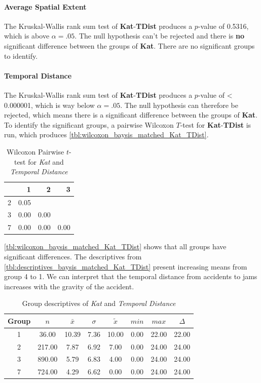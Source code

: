 \paragraph{Average Spatial Extent}
The Kruskal-Wallis rank sum test of \textbf{Kat}-\textbf{TDist} produces a $p$-value of 0.5316, which is above $\alpha=.05$. The null hypothesis can't be rejected and there is \textbf{no} significant difference between the groups of \textbf{Kat}. There are no significant groups to identify.

\paragraph{Temporal Distance}
The Kruskal-Wallis rank sum test of \textbf{Kat}-\textbf{TDist} produces a $p$-value of < 0.000001, which is way below $\alpha=.05$. The null hypothesis can therefore be rejected, which means there is a significant difference between the groups of \textbf{Kat}. To identify the significant groups, a pairwise Wilcoxon $T$-test for \textbf{Kat}-\textbf{TDist} is run, which produces \autoref{tbl:wilcoxon_baysis_matched_Kat_TDist}. 
\begin{table}[ht]
	\small
	\centering
	\begin{tabular}{rrrr}
		\toprule
		& 1 & 2 & 3 \\ 
		\midrule
		2 & 0.05 &  &  \\ 
		3 & 0.00 & 0.00 &  \\ 
		7 & 0.00 & 0.00 & 0.00 \\ 
		\bottomrule
	\end{tabular}
	\caption{Wilcoxon Pairwise $t$-test for \textit{Kat} and \textit{Temporal Distance}}
	\label{tbl:wilcoxon_baysis_matched_Kat_TDist}
\end{table}
\autoref{tbl:wilcoxon_baysis_matched_Kat_TDist} shows that all groups have significant differences. The descriptives from \autoref{tbl:descriptives_baysis_matched_Kat_TDist} present increasing means from group 4 to 1. We can interpret that the temporal distance from accidents to jams increases with the gravity of the accident.
\begin{table}[ht]
	\small
	\centering
	\begin{tabular}{c|c|c|c|c|c|c|c}
	  	\toprule
		Group & $n$ & $\bar{x}$ & $\sigma$ & $\tilde{x}$ & $min$ & $max$ & $\Delta$ \\ 
	  	\midrule
		1 & 36.00 & 10.39 & 7.36 & 10.00 & 0.00 & 22.00 & 22.00 \\ 
	  	2 & 217.00 & 7.87 & 6.92 & 7.00 & 0.00 & 24.00 & 24.00 \\ 
	  	3 & 890.00 & 5.79 & 6.83 & 4.00 & 0.00 & 24.00 & 24.00 \\ 
	  	7 & 724.00 & 4.29 & 6.62 & 0.00 & 0.00 & 24.00 & 24.00 \\ 
	   	\bottomrule
	\end{tabular}
	\caption{Group descriptives of \textit{Kat} and \textit{Temporal Distance}}
	\label{tbl:descriptives_baysis_matched_Kat_TDist}
\end{table}

